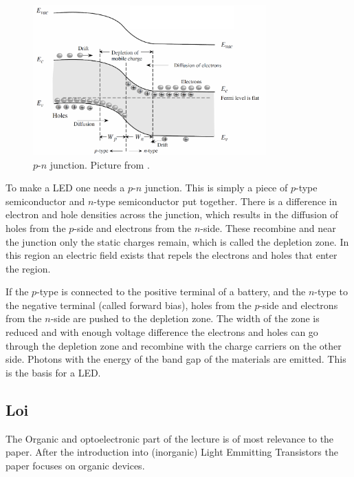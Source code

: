 \begin{figure}[!ht]
 \begin{center}
  \includegraphics[width=0.8\textwidth]{pn_junction}
  \caption{$p$-$n$ junction. Picture from \citet{vanweesbook}.}
  \label{fig:pn_junction}
 \end{center}
\end{figure}

To make a LED one needs a $p$-$n$ junction. This is simply a piece of $p$-type semiconductor and $n$-type semiconductor put together. There is a difference in electron and hole densities across the junction, which results in the diffusion of holes from the $p$-side and electrons from the $n$-side. These recombine and near the junction only the static charges remain, which is called the depletion zone. In this region an electric field exists that repels the electrons and holes that enter the region.

If the $p$-type is connected to the positive terminal of a battery, and the $n$-type to the negative terminal (called forward bias), holes from the $p$-side and electrons from the $n$-side are pushed to the depletion zone. The width of the zone is reduced and with enough voltage difference the electrons and holes can go through the depletion zone and recombine with the charge carriers on the other side. Photons with the energy of the band gap of the materials are emitted. This is the basis for a LED.



\subsection{Loi}
The Organic and optoelectronic part of the lecture is of most relevance to the paper. After the introduction into (inorganic) Light Emmitting Transistors the paper focuses on organic devices.  \citep{loinotes}

